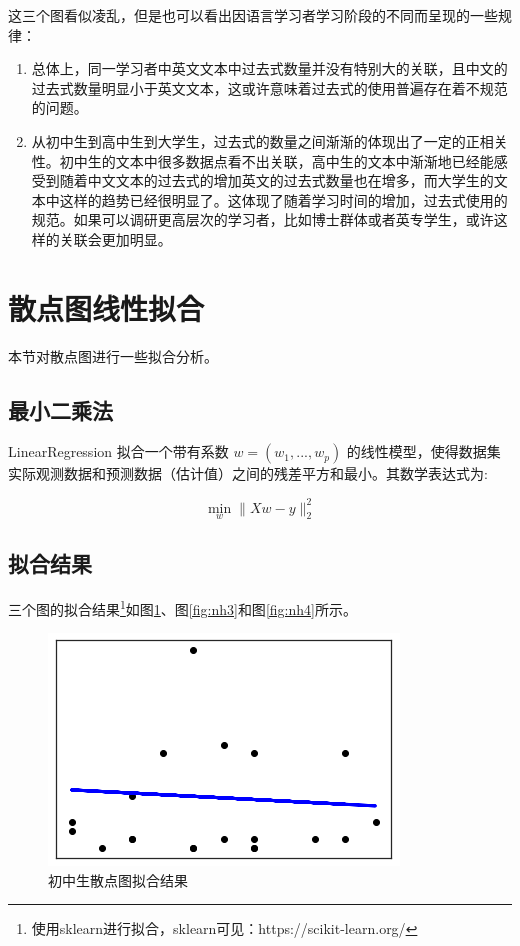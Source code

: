 \documentclass[]{article}
\begin{document}
这三个图看似凌乱，但是也可以看出因语言学习者学习阶段的不同而呈现的一些规律：

\begin{enumerate}
	\item 总体上，同一学习者中英文文本中过去式数量并没有特别大的关联，且中文的过去式数量明显小于英文文本，这或许意味着过去式的使用普遍存在着不规范的问题。
	\item 从初中生到高中生到大学生，过去式的数量之间渐渐的体现出了一定的正相关性。初中生的文本中很多数据点看不出关联，高中生的文本中渐渐地已经能感受到随着中文文本的过去式的增加英文的过去式数量也在增多，而大学生的文本中这样的趋势已经很明显了。这体现了随着学习时间的增加，过去式使用的规范。如果可以调研更高层次的学习者，比如博士群体或者英专学生，或许这样的关联会更加明显。
\end{enumerate}

\section{散点图线性拟合}

本节对散点图进行一些拟合分析。

\subsection{最小二乘法}

LinearRegression\cite{sklearn} 拟合一个带有系数 $w = (w_1, ..., w_p) $ 的线性模型，使得数据集实际观测数据和预测数据（估计值）之间的残差平方和最小。其数学表达式为:

\begin{equation}
\min_w\|Xw-y\|_2^2
\end{equation}

\subsection{拟合结果}

三个图的拟合结果\footnote{使用sklearn进行拟合，sklearn可见：https://scikit-learn.org/}如图\ref{fig:nh2}、图\ref{fig:nh3}和图\ref{fig:nh4}所示。

\begin{figure}
	\centering
	\includegraphics[width=0.7\linewidth]{fig/nh2}
	\caption{初中生散点图拟合结果}
	\label{fig:nh2}
\end{figure}
\end{document}
